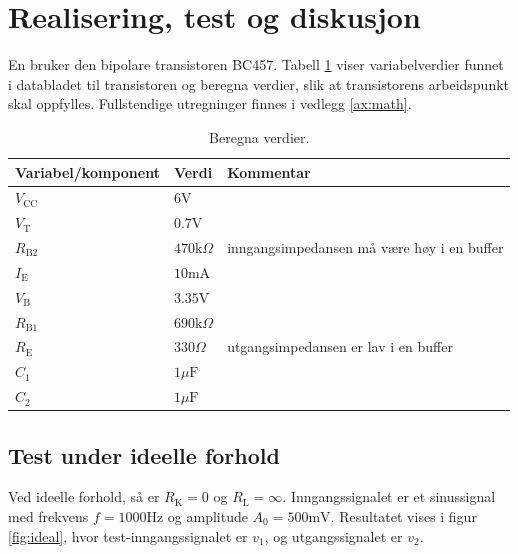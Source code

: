 \section{Realisering, test og diskusjon}
\label{sec:realisering}

En bruker den bipolare transistoren BC457. Tabell \ref{tab:vars} viser variabelverdier funnet i databladet til transistoren og beregna verdier, slik at transistorens arbeidspunkt skal oppfylles. Fullstendige utregninger finnes i vedlegg \ref{ax:math}.

\vspace{1cm}
\begin{table}[!h]
\centering %
\caption{Beregna verdier.}
\label{tab:vars}	%
\begin{tabular}{lll} %
\toprule %
\textbf{Variabel/komponent} & \textbf{Verdi} & \textbf{Kommentar} \\
\midrule
$V_{\text{CC}}$ & $6\text{V}$ & \\
$V_\text{T}$ & $0.7\text{V}$ & \\
$R_{\text{B}2}$ & $470\text{k}\Omega$ & inngangsimpedansen må være høy i en buffer \\
$I_\text{E}$ & $10\text{mA}$ & \\
$V_\text{B}$ & $3.35\text{V}$ & \\
$R_{\text{B}1}$ & $690\text{k}\Omega$ & \\
$R_\text{E}$ & $330\Omega$ & utgangsimpedansen er lav i en buffer \\
$C_1$ & $1\mu\text{F}$ & \\
$C_2$ & $1\mu\text{F}$ & \\
\bottomrule 
\end{tabular}
\end{table}
\vspace{1cm}
\clearpage

\subsection{Test under ideelle forhold}
Ved ideelle forhold, så er $R_\text{K}=0$ og $R_\text{L}=\infty$. Inngangssignalet er et sinussignal med frekvens $f=1000\text{Hz}$ og amplitude $A_0=500\text{mV}$. Resultatet vises i figur \ref{fig:ideal}, hvor test-inngangssignalet er $v_1$, og utgangssignalet er $v_2$.

